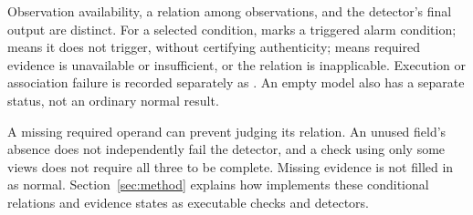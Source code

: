 Observation availability, a relation among observations, and the detector's final output are distinct. For a selected condition,  marks a triggered alarm condition;  means it does not trigger, without certifying authenticity;  means required evidence is unavailable or insufficient, or the relation is inapplicable. Execution or association failure is recorded separately as . An empty model also has a separate status, not an ordinary normal result.

A missing required operand can prevent judging its relation. An unused field's absence does not independently fail the detector, and a check using only some views does not require all three to be complete. Missing evidence is not filled in as normal. Section~\ref{sec:method} explains how \hg implements these conditional relations and evidence states as executable checks and detectors.
